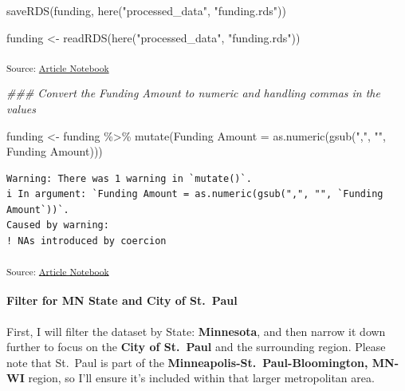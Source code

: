 \documentclass[
  letterpaper,
  DIV=11,
  numbers=noendperiod]{scrartcl}
\let\oldparagraph\paragraph
\renewcommand{\paragraph}[1]{\oldparagraph{#1}\mbox{}}
\newenvironment{Shaded}{\begin{snugshade}}{\end{snugshade}}
\newcommand{\AttributeTok}[1]{\textcolor[rgb]{0.40,0.45,0.13}{#1}}
\newcommand{\DocumentationTok}[1]{\textcolor[rgb]{0.37,0.37,0.37}{\textit{#1}}}
\newcommand{\FunctionTok}[1]{\textcolor[rgb]{0.28,0.35,0.67}{#1}}
\newcommand{\NormalTok}[1]{\textcolor[rgb]{0.00,0.23,0.31}{#1}}
\newcommand{\OtherTok}[1]{\textcolor[rgb]{0.00,0.23,0.31}{#1}}
\newcommand{\SpecialCharTok}[1]{\textcolor[rgb]{0.37,0.37,0.37}{#1}}
\newcommand{\StringTok}[1]{\textcolor[rgb]{0.13,0.47,0.30}{#1}}
\begin{document}
\begin{Shaded}
\begin{Highlighting}[]
\FunctionTok{saveRDS}\NormalTok{(funding, }\FunctionTok{here}\NormalTok{(}\StringTok{"processed\_data"}\NormalTok{, }\StringTok{"funding.rds"}\NormalTok{))}

\NormalTok{funding }\OtherTok{\textless{}{-}} \FunctionTok{readRDS}\NormalTok{(}\FunctionTok{here}\NormalTok{(}\StringTok{"processed\_data"}\NormalTok{, }\StringTok{"funding.rds"}\NormalTok{))}
\end{Highlighting}
\end{Shaded}

\textsubscript{Source:
\href{https://beeckcenter.github.io/climate-equity-workforce/index-preview.html}{Article
Notebook}}

\begin{Shaded}
\begin{Highlighting}[]
\DocumentationTok{\#\#\# Convert the \textasciigrave{}Funding Amount\textasciigrave{} to numeric and handling commas in the values}

\NormalTok{funding }\OtherTok{\textless{}{-}}\NormalTok{ funding }\SpecialCharTok{\%\textgreater{}\%}
  \FunctionTok{mutate}\NormalTok{(}\StringTok{\textasciigrave{}}\AttributeTok{Funding Amount}\StringTok{\textasciigrave{}} \OtherTok{=} \FunctionTok{as.numeric}\NormalTok{(}\FunctionTok{gsub}\NormalTok{(}\StringTok{","}\NormalTok{, }\StringTok{""}\NormalTok{, }\StringTok{\textasciigrave{}}\AttributeTok{Funding Amount}\StringTok{\textasciigrave{}}\NormalTok{)))}
\end{Highlighting}
\end{Shaded}

\begin{verbatim}
Warning: There was 1 warning in `mutate()`.
i In argument: `Funding Amount = as.numeric(gsub(",", "", `Funding Amount`))`.
Caused by warning:
! NAs introduced by coercion
\end{verbatim}

\textsubscript{Source:
\href{https://beeckcenter.github.io/climate-equity-workforce/index-preview.html}{Article
Notebook}}

\paragraph{Filter for MN State and City of
St.~Paul}\label{filter-for-mn-state-and-city-of-st.-paul}

First, I will filter the dataset by State: \textbf{Minnesota}, and then
narrow it down further to focus on the \textbf{City of St.~Paul} and the
surrounding region. Please note that St.~Paul is part of the
\textbf{Minneapolis-St.~Paul-Bloomington, MN-WI} region, so I'll ensure
it's included within that larger metropolitan area.
\end{document}
